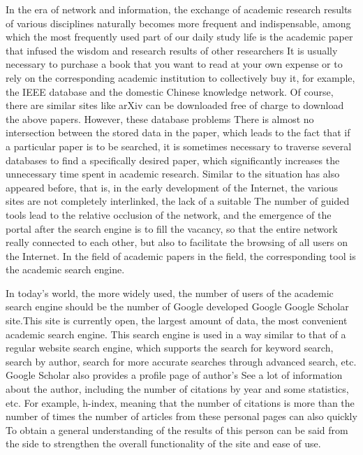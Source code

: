 
\begin{bigabstract}

In the era of network and information, the exchange of academic research results of various disciplines naturally becomes more frequent and indispensable, among which the most frequently used part of our daily study life is the academic paper that infused the wisdom and research results of other researchers It is usually necessary to purchase a book that you want to read at your own expense or to rely on the corresponding academic institution to collectively buy it, for example, the IEEE database and the domestic Chinese knowledge network. Of course, there are similar sites like arXiv can be downloaded free of charge to download the above papers. However, these database problems There is almost no intersection between the stored data in the paper, which leads to the fact that if a particular paper is to be searched, it is sometimes necessary to traverse several databases to find a specifically desired paper, which significantly increases the unnecessary time spent in academic research. Similar to the situation has also appeared before, that is, in the early development of the Internet, the various sites are not completely interlinked, the lack of a suitable The number of guided tools lead to the relative occlusion of the network, and the emergence of the portal after the search engine is to fill the vacancy, so that the entire network really connected to each other, but also to facilitate the browsing of all users on the Internet. In the field of academic papers in the field, the corresponding tool is the academic search engine.

In today's world, the more widely used, the number of users of the academic search engine should be the number of Google developed Google Google Scholar site.This site is currently open, the largest amount of data, the most convenient academic search engine. This search engine is used in a way similar to that of a regular website search engine, which supports the search for keyword search, search by author, search for more accurate searches through advanced search, etc. Google Scholar also provides a profile page of author's See a lot of information about the author, including the number of citations by year and some statistics, etc. For example, h-index, meaning that the number of citations is more than the number of times the number of articles from these personal pages can also quickly To obtain a general understanding of the results of this person can be said from the side to strengthen the overall functionality of the site and ease of use.


\end{bigabstract}
